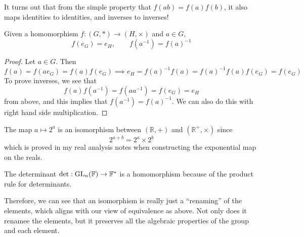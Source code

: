  It turns out that from the simple property that $f(ab) = f(a) f(b)$, it also maps identities to identities, and inverses to inverses!  

  \begin{lemma}
    Given a homomorphism $f: (G, \ast) \rightarrow (H, \times)$ and $a \in G$, 
    \begin{equation}
      f(e_G) = e_H, \qquad f(a^{-1}) = f(a)^{-1}
    \end{equation}
  \end{lemma}
  \begin{proof}
    Let $a \in G$. Then 
    \begin{equation}
      f(a) = f(a e_G) = f(a) f(e_G) \implies e_H = f(a)^{-1} f(a) = f(a)^{-1} f(a) f(e_G) = f(e_G)
    \end{equation}
    To prove inverses, we see that 
    \begin{equation}
      f(a) f(a^{-1}) = f(a a^{-1}) = f(e_G) = e_H
    \end{equation}
    from above, and this implies that $f(a^{-1}) = f(a)^{-1}$. We can also do this with right hand side multiplication. 
  \end{proof}

  \begin{example}
    The map $a \mapsto 2^{a}$ is an isomorphism between $(\mathbb{R}, +)$ and $(\mathbb{R}^{+}, \times)$ since 
    \begin{equation}
      2^{a+b} = 2^a \times 2^b
    \end{equation} 
    which is proved in my real analysis notes when constructing the exponential map on the reals. 
  \end{example} 

  \begin{example}[Determinant]
    The determinant $\det: \GL_n (\mathbb{F}) \rightarrow \mathbb{F}^\ast$ is a homomorphism because of the product rule for determinants. 
  \end{example}

  Therefore, we can see that an isomorphism is really just a ``renaming'' of the elements, which aligns with our view of equivalence as above. Not only does it renamee the elements, but it preserves all the algebraic properties of the group and each element. 

